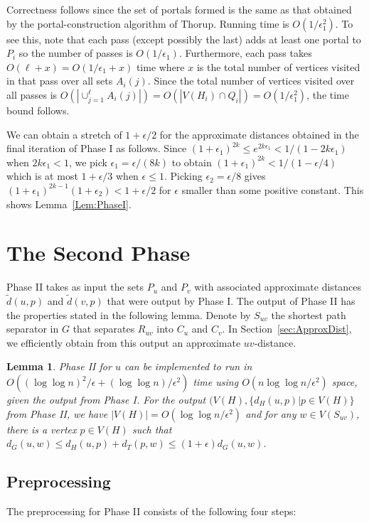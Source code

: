 \documentclass[11pt]{article}
\newtheorem{lemma}{Lemma}
\begin{document}
Correctness follows since the set of portals formed is the same as that obtained by the portal-construction algorithm of Thorup. Running time is $O(1/\epsilon_1^2)$. To see this, note that each pass (except possibly the last) adds at least one portal to $P_i$ so the number of passes is $O(1/\epsilon_1)$. Furthermore, each pass takes $O(\ell + x) = O(1/\epsilon_1 + x)$ time where $x$ is the total number of vertices visited in that pass over all sets $A_i(j)$. Since the total number of vertices visited over all passes is $O(|\cup_{j = 1}^{\ell}A_i(j)|) = O(|V(H_i)\cap Q_i|) = O(1/\epsilon_1^2)$, the time bound follows.

We can obtain a stretch of $1 + \epsilon/2$ for the approximate distances obtained in the final iteration of Phase I as follows. Since $(1+\epsilon_1)^{2k}\leq e^{2k\epsilon_1} < 1/(1 - 2k\epsilon_1)$ when $2k\epsilon_1 < 1$, we pick $\epsilon_1 = \epsilon/(8k)$ to obtain $(1+\epsilon_1)^{2k} < 1/(1 - \epsilon/4)$ which is at most $1 + \epsilon/3$ when $\epsilon\leq 1$. Picking $\epsilon_2 = \epsilon/8$ gives
$(1+\epsilon_1)^{2k-1}(1+\epsilon_2) < 1+\epsilon/2$ for $\epsilon$ smaller than some positive constant. This shows Lemma~\ref{Lem:PhaseI}.

\section{The Second Phase}\label{sec:PhaseII}
Phase II takes as input the sets $P_u$ and $P_v$ with associated approximate distances $\tilde d(u,p)$ and $\tilde d(v,p)$ that were output by Phase I. The output of Phase II has the properties stated in the following lemma. Denote by $S_{uv}$ the shortest path separator in $G$ that separates $R_{uv}$ into $C_u$ and $C_v$. In Section~\ref{sec:ApproxDist}, we efficiently obtain from this output an approximate $uv$-distance.
\begin{lemma}\label{Lem:PhaseII}
Phase II for $u$ can be implemented to run in $O((\log\log n)^2/\epsilon + (\log\log n)/\epsilon^2)$ time using $O(n\log\log n/\epsilon^2)$ space, given the output from Phase I. For the output $(V(H),\{d_H(u,p) | p\in V(H)\}$ from Phase II, we have $|V(H)| = O(\log\log n/\epsilon^2)$ and for any $w\in V(S_{uv})$, there is a vertex $p\in V(H)$ such that $d_G(u,w)\leq d_H(u,p) + d_T(p,w)\leq (1+\epsilon)d_G(u,w)$.
\end{lemma}

\subsection{Preprocessing}
The preprocessing for Phase II consists of the following four steps:
\end{document}
